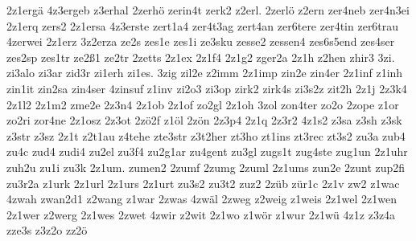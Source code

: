 {2z1ergä
4z3ergeb
z3erhal
2zerhö
zerin4t
zerk2
z2erl.
2zerlö
z2ern
zer4neb
zer4n3ei
2z1erq
zers2
2z1ersa
4z3erste
zert1a4
zer4t3ag
zert4an
zer6tere
zer4tin
zer6trau
4zerwei
2z1erz
3z2erza
ze2s
zes1e
zes1i
ze3sku
zesse2
zessen4
zes6s5end
zes4ser
zes2sp
zes1tr
ze2ß1
ze2tr
2zetts
2z1ex
2z1f4
2z1g2
zger2a
2z1h
z2hen
zhir3
3zi.
zi3alo
zi3ar
zid3r
zi1erh
zi1es.
3zig
zil2e
z2imm
2z1imp
zin2e
zin4er
2z1inf
z1inh
zin1it
zin2sa
zin4ser
4zinsuf
z1inv
zi2o3
zi3op
zirk2
zirk4s
zi3s2z
zit2h
2z1j
2z3k4
2z1l2
2z1m2
zme2e
2z3n4
2z1ob
2z1of
zo2gl
2z1oh
3zol
zon4ter
zo2o
2zope
z1or
zo2ri
zor4ne
2z1osz
2z3ot
2zö2f
z1öl
2zön
2z3p4
2z1q
2z3r2
4z1s2
z3sa
z3sh
z3sk
z3str
z3sz
2z1t
z2t1au
z4tehe
zte3str
z3t2her
zt3ho
zt1ins
zt3rec
zt3s2
zu3a
zub4
zu4c
zud4
zudi4
zu2el
zu3f4
zu2g1ar
zu4gent
zu3gl
zugs1t
zug4ste
zug1un
2z1uhr
zuh2u
zu1i
zu3k
2z1um.
zumen2
2zumf
2zumg
2zuml
2z1ums
zun2e
2zunt
zup2fi
zu3r2a
z1urk
2z1url
2z1urs
2z1urt
zu3s2
zu3t2
zuz2
2züb
zür1c
2z1v
zw2
z1wac
4zwah
zwan2d1
z2wang
z1war
2zwas
4zwäl
2zweg
z2weig
z1weis
2z1wel
2z1wen
2z1wer
z2werg
2z1wes
2zwet
4zwir
z2wit
2z1wo
z1wör
z1wur
2z1wü
4z1z
z3z4a
zze3s
z3z2o
zz2ö
}

\endinput

